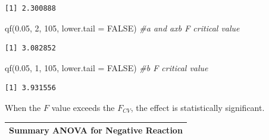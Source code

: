 \documentclass[
  11pt,
]{book}
\newenvironment{Shaded}{\begin{snugshade}}{\end{snugshade}}
\newcommand{\AttributeTok}[1]{\textcolor[rgb]{0.77,0.63,0.00}{#1}}
\newcommand{\CommentTok}[1]{\textcolor[rgb]{0.56,0.35,0.01}{\textit{#1}}}
\newcommand{\ConstantTok}[1]{\textcolor[rgb]{0.00,0.00,0.00}{#1}}
\newcommand{\DecValTok}[1]{\textcolor[rgb]{0.00,0.00,0.81}{#1}}
\newcommand{\FloatTok}[1]{\textcolor[rgb]{0.00,0.00,0.81}{#1}}
\newcommand{\FunctionTok}[1]{\textcolor[rgb]{0.00,0.00,0.00}{#1}}
\newcommand{\NormalTok}[1]{#1}
\begin{document}
\begin{verbatim}
[1] 2.300888
\end{verbatim}

\begin{Shaded}
\begin{Highlighting}[]
\FunctionTok{qf}\NormalTok{(}\FloatTok{0.05}\NormalTok{, }\DecValTok{2}\NormalTok{, }\DecValTok{105}\NormalTok{, }\AttributeTok{lower.tail =} \ConstantTok{FALSE}\NormalTok{)  }\CommentTok{\#a and axb F critical value}
\end{Highlighting}
\end{Shaded}

\begin{verbatim}
[1] 3.082852
\end{verbatim}

\begin{Shaded}
\begin{Highlighting}[]
\FunctionTok{qf}\NormalTok{(}\FloatTok{0.05}\NormalTok{, }\DecValTok{1}\NormalTok{, }\DecValTok{105}\NormalTok{, }\AttributeTok{lower.tail =} \ConstantTok{FALSE}\NormalTok{)  }\CommentTok{\#b F critical value}
\end{Highlighting}
\end{Shaded}

\begin{verbatim}
[1] 3.931556
\end{verbatim}

When the \(F\) value exceeds the \(F_{CV}\), the effect is statistically significant.

\begin{longtable}[]{@{}l@{}}
\toprule()
Summary ANOVA for Negative Reaction \\
\midrule()
\endhead
\bottomrule()
\end{longtable}
\end{document}
